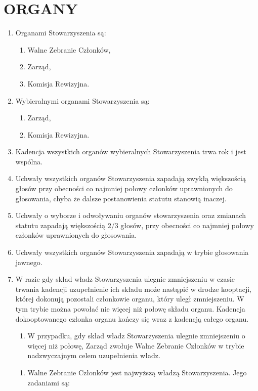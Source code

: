 \documentclass[a4paper,draft,10pt]{article}
\begin{document}
\section{ORGANY}
  \begin{enumerate}
    \item Organami Stowarzyszenia są:
      \begin{enumerate}
        \item Walne Zebranie Członków,
        \item Zarząd,
        \item Komisja Rewizyjna.
      \end{enumerate}
    \item Wybieralnymi organami Stowarzyszenia są:
      \begin{enumerate}
        \item Zarząd,
        \item Komisja Rewizyjna.
      \end{enumerate}
    \item Kadencja wszystkich organów wybieralnych Stowarzyszenia trwa rok i jest wspólna.
    \item Uchwały wszystkich organów Stowarzyszenia zapadają zwykłą większością głosów przy obecności co najmniej połowy członków uprawnionych do głosowania, chyba że dalsze postanowienia statutu stanowią inaczej.
    \item Uchwały o wyborze i odwoływaniu organów stowarzyszenia oraz zmianach statutu zapadają większością 2/3 głosów, przy obecności co najmniej połowy członków uprawnionych do głosowania.
    \item Uchwały wszystkich organów Stowarzyszenia zapadają w trybie głosowania jawnego.
    \item W razie gdy skład władz Stowarzyszenia ulegnie zmniejszeniu w czasie trwania kadencji uzupełnienie ich składu może nastąpić w drodze kooptacji, której dokonują pozostali członkowie organu, który uległ zmniejszeniu. W tym trybie można powołać nie więcej niż połowę składu organu. Kadencja dokooptowanego członka organu kończy się wraz z kadencją całego organu.
    \begin{enumerate}
    	\item W przypadku, gdy skład władz Stowarzyszenia ulegnie zmniejszeniu o więcej niż połowę, Zarząd zwołuje Walne Zebranie Członków w trybie nadzwyczajnym celem uzupełnienia władz.
    \end{enumerate}
    \begin{enumerate}
	    \item Walne Zebranie Członków jest najwyższą władzą Stowarzyszenia. Jego zadaniami są:

\end{enumerate}
\end{enumerate}
\end{document}
